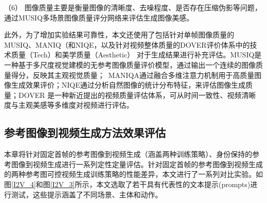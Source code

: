 （6） 图像质量主要是衡量图像的清晰度、去噪程度、是否存在压缩伪影等问题，通过MUSIQ多场景图像质量评分网络来评估生成图像美感。

此外，为了增加实验结果可靠性，本文还使用了包括针对单帧图像质量的MUSIQ\cite{ke2021musiq}、MANIQ\cite{maniqa}（和NIQE\cite{niqe}，以及针对视频整体质量的DOVER\cite{dover}评价体系中的技术质量（Tech）和美学质量（Aesthetic）
对于生成结果进行补充评估。MUSIQ是一种基于多尺度视觉建模的无参考图像质量评价模型，通过输出一个连续的图像质量得分，反映其主观视觉质量；\
MANIQA通过融合多维注意力机制用于高质量图像生成效果评价；NIQE通过分析自然图像的统计分布特征，来评估图像生成质量；DOVER 是一种新近提出的视频质量评估体系，可从时间一致性、视频清晰度与主观美感等多维度对视频进行评估。


\subsection{参考图像到视频生成方法效果评估}
本章将针对固定首帧的参考图像到视频生成（涵盖两种训练策略）、身份保持的参考图像到视频生成进行一系列定性定量评估。针对固定首帧的参考图像到视频生成的两种参考图可控视频生成训练策略的性能差异，本文进行了一系列对比实验。如图\ref{I2V_4}和图\ref{I2V_3}所示，本文选取了若干具有代表性的文本提示(prompts)进行测试，这些提示涵盖了不同场景、主体和动作。

